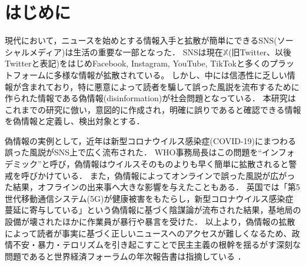 \chapter{はじめに}
\label{ch:introduction}
現代において，ニュースを始めとする情報入手と拡散が簡単にできるSNS(ソーシャルメディア)は生活の重要な一部となった．
SNSは現在$\mathbb{X}$(旧Twitter、以後Twitterと表記)をはじめFacebook, Instagram, YouTube, TikTokと多くのプラットフォームに多様な情報が拡散されている。
しかし、中には信憑性に乏しい情報が含まれており，特に悪意によって読者を騙して誤った風説を流布するために作られた情報である偽情報(disinformation)が社会問題となっている．
本研究はこれまでの研究\cite{Shu:2017:FND:3137597.3137600,Ruchansky:2017:CHD:3132847.3132877,Wang:2018:EEA:3219819.3219903}に倣い，意図的に作成され，明確に誤りであると確認できる情報を偽情報と定義し、検出対象とする．

偽情報の実例として，近年は新型コロナウイルス感染症(COVID-19)にまつわる誤った風説がSNS上で広く流布された．
WHO事務局長はこの問題を``インフォデミック''と呼び，偽情報はウイルスそのものよりも早く簡単に拡散されると警戒を呼びかけている\cite{ZAROCOSTAS2020676}．
また，偽情報によってオンラインで誤った風説が広がった結果，オフラインの出来事へ大きな影響を与えたこともある．
英国では「第5世代移動通信システム(5G)が健康被害をもたらし，新型コロナウイルス感染症蔓延に寄与している」という偽情報に基づく陰謀論が流布された結果，基地局の設備が壊された\cite{waterson_hern_2020}ほかに作業員が暴行や暴言を受けた\cite{hern_2020}．
以上より，偽情報の拡散によって読者が事実に基づく正しいニュースへのアクセスが難しくなるため、政情不安・暴力・テロリズムを引き起こすことで民主主義の根幹を揺るがす深刻な問題であると世界経済フォーラムの年次報告書は指摘している \cite{mclennan2024global}．


